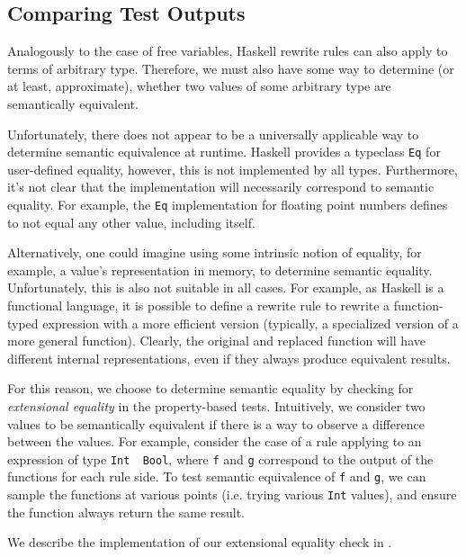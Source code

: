 \subsection{Comparing Test Outputs}\label{sec:methodology:testoutput}

Analogously to the case of free variables, Haskell rewrite rules can also apply
to terms of arbitrary type. Therefore, we must also have some way to determine
(or at least, approximate), whether two values of some arbitrary type are
semantically equivalent.

Unfortunately, there does not appear to be a universally applicable way to
determine semantic equivalence at runtime. Haskell provides a typeclass
\texttt{Eq} for user-defined equality, however, this is not implemented by all
types. Furthermore, it's not clear that the implementation will necessarily
correspond to semantic equality. For example, the \texttt{Eq} implementation for
floating point numbers defines \NaN to not equal any other value, including itself.

Alternatively, one could imagine using some intrinsic notion of equality, for
example, a value's representation in memory, to determine semantic equality.
Unfortunately, this is also not suitable in all cases. For example, as Haskell
is a functional language, it is possible to define a rewrite rule to rewrite a
function-typed expression with a more efficient version (typically, a
specialized version of a more general function). Clearly, the original and
replaced function will have different internal representations, even if they
always produce equivalent results.

For this reason, we choose to determine semantic equality by checking for
\textit{extensional equality} in the property-based tests. Intuitively, we
consider two values to be semantically equivalent if there is a way to observe a
difference between the values. For example, consider the case of a rule applying
to an expression of type \mbox{\texttt{Int \textrightarrow~Bool}}, where
\texttt{f} and \texttt{g} correspond to the output of the functions for each
rule side. To test semantic equivalence of \texttt{f} and \texttt{g}, we can
sample the functions at various points (i.e. trying various \texttt{Int}
values), and ensure the function always return the same result.

We describe the implementation of our extensional equality check in
.
